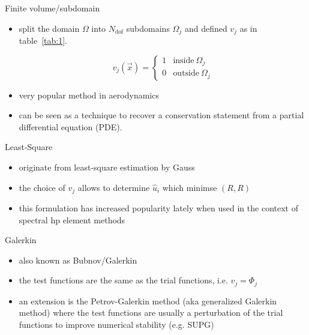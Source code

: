 \begin{frame}{Finite volume/subdomain}
  \begin{itemize}
  \item split the domain $\Omega$ into $N_{\text{dof}}$ subdomains
    $\Omega_j$ and defined $v_j$ as in table~\ref{tab:1}.

    \begin{equation}
      \label{eq:7}
      v_j(\overrightarrow{x})=
      \begin{cases}
        1 & \text{inside} \ \Omega_j\\
        0 & \text{outside} \ \Omega_j
      \end{cases}
    \end{equation}
  \item very popular method in aerodynamics
  \item can be seen as a technique to recover a conservation statement from a partial differential equation (PDE).
  \end{itemize}
\end{frame}

\begin{frame}{Least-Square}
  \begin{itemize}
  \item originate from least-square estimation by Gauss
  \item the choice of $v_j$ allows to determine $\hat{u}_i$ which minimse $(R,R)$
  \item this formulation has increased popularity lately when used in the context of spectral hp element methods
  \end{itemize}
\end{frame}

\begin{frame}{Galerkin}
  \begin{itemize}
  \item also known as Bubnov/Galerkin
  \item the test functions are the same as the trial functions, i.e. $v_j = \Phi_j$
  \item an extension is the Petrov-Galerkin method (aka generalized Galerkin method)
    where the test functions are usually a perturbation of the trial
    functions to improve numerical stability (e.g. SUPG)
  \end{itemize}

\end{frame}

